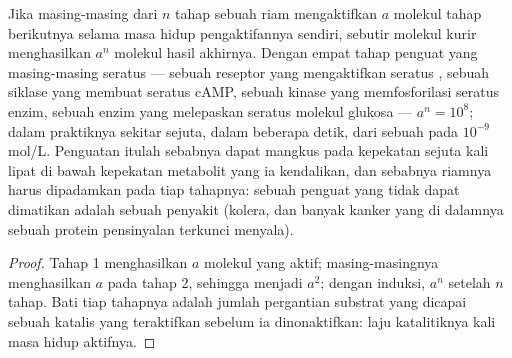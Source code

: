 \begin{theorem}\label{thm:b2:cell-signalling:amplification}
Jika masing-masing dari $n$ tahap sebuah riam mengaktifkan $a$ molekul
tahap berikutnya selama masa hidup pengaktifannya sendiri, sebutir
molekul kurir menghasilkan $a^{n}$ molekul hasil akhirnya. Dengan empat
tahap penguat yang masing-masing seratus --- sebuah reseptor yang
mengaktifkan seratus , sebuah siklase yang membuat seratus
cAMP, sebuah kinase yang memfosforilasi seratus enzim, sebuah enzim
yang melepaskan seratus molekul glukosa --- $a^{n} = 10^{8}$; dalam
praktiknya sekitar sejuta, dalam beberapa detik, dari sebuah 
pada $10^{-9}$ mol/L. Penguatan itulah sebabnya  dapat mangkus
pada kepekatan sejuta kali lipat di bawah kepekatan metabolit yang ia
kendalikan, dan sebabnya riamnya harus dipadamkan pada tiap tahapnya:
sebuah penguat yang tidak dapat dimatikan adalah sebuah penyakit
(kolera, dan banyak kanker yang di dalamnya sebuah protein pensinyalan
terkunci menyala).
\end{theorem}
\begin{proof}
Tahap 1 menghasilkan $a$ molekul yang aktif; masing-masingnya
menghasilkan $a$ pada tahap 2, sehingga menjadi $a^{2}$; dengan
induksi, $a^{n}$ setelah $n$ tahap. Bati tiap tahapnya adalah jumlah
pergantian substrat yang dicapai sebuah katalis yang teraktifkan
sebelum ia dinonaktifkan: laju katalitiknya kali masa hidup aktifnya.
\end{proof}

